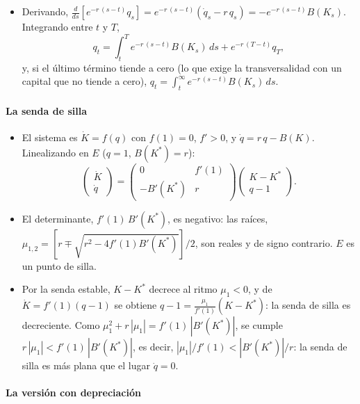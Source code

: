 \documentclass[11pt]{article}
\begin{document}
\begin{itemize}
\item Derivando, $\frac{d}{ds}\left[e^{-r\,(s-t)}q_s\right]=e^{-r\,(s-t)}(\dot q_s-r\,q_s)=-e^{-r\,(s-t)}B(K_s)$. Integrando entre $t$ y $T$,
  \begin{equation*}
  q_t=\int_t^{T}e^{-r\,(s-t)}B(K_s)\,ds+e^{-r\,(T-t)}q_T,
  \end{equation*}
  y, si el último término tiende a cero (lo que exige la transversalidad con un capital que no tiende a cero), $q_t=\int_t^{\infty}e^{-r\,(s-t)}B(K_s)\,ds$. \findemo
\end{itemize}

\paragraph{La senda de silla}

\begin{itemize}
\item El sistema es $\dot K=f(q)$ con $f(1)=0$, $f'>0$, y $\dot q=r\,q-B(K)$. Linealizando en $E$ ($q=1$, $B(K^*)=r$):
  \begin{equation*}
  \begin{pmatrix}\dot K\\ \dot q\end{pmatrix}=\begin{pmatrix}0 & f'(1)\\ -B'(K^*) & r\end{pmatrix}\begin{pmatrix}K-K^*\\ q-1\end{pmatrix}.
  \end{equation*}
\item El determinante, $f'(1)\,B'(K^*)$, es negativo: las raíces, $\mu_{1,2}=\left[r\mp\sqrt{r^2-4f'(1)B'(K^*)}\right]/2$, son reales y de signo contrario. $E$ es un punto de silla.
\item Por la senda estable, $K-K^*$ decrece al ritmo $\mu_1<0$, y de $\dot K=f'(1)(q-1)$ se obtiene $q-1=\frac{\mu_1}{f'(1)}(K-K^*)$: la senda de silla es decreciente. Como $\mu_1^2+r\,|\mu_1|=f'(1)\,|B'(K^*)|$, se cumple $r\,|\mu_1|<f'(1)\,|B'(K^*)|$, es decir, $|\mu_1|/f'(1)<|B'(K^*)|/r$: la senda de silla es más plana que el lugar $\dot q=0$. \findemo
\end{itemize}

\paragraph{La versión con depreciación}
\end{document}
